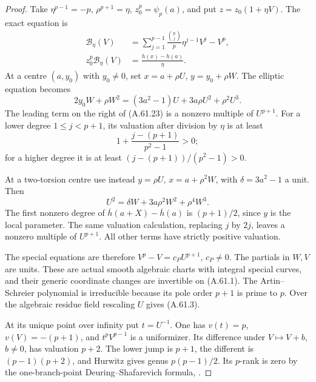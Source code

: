 \begin{proof}
Take \(\eta^{p-1}=-p\), \(\rho^{p+1}=\eta\),
\(z_0^p=\psi_p(a)\), and put
\(z=z_0(1+\eta V)\). The exact equation is
\[
 \begin{aligned}
 \mathcal B_\eta(V)
    &=\sum_{j=1}^{p-1}\frac{\binom pj}{p}
                       \eta^{j-1}V^j-V^p,\\
 z_0^p\mathcal B_\eta(V)
    &=\frac{h(x)-h(a)}{\eta}.
 \end{aligned} \tag{A.61.23}
\]
At a centre \((a,y_0)\) with \(y_0\ne0\), set
\(x=a+\rho U\), \(y=y_0+\rho W\). The elliptic
equation becomes
\[
 2y_0W+\rho W^2
             =(3a^2-1)U+3a\rho U^2+\rho^2U^3.         \tag{A.61.24}
\]
The leading term on the right of (A.61.23) is
a nonzero multiple of \(U^{p+1}\).
For a lower degree \(1\le j<p+1\), its valuation
after division by \(\eta\) is at least
\[
                   1+\frac{j-(p+1)}{p^2-1}>0;
                                                        \tag{A.61.25}
\]
for a higher degree it is at least
\((j-(p+1))/(p^2-1)>0\).

At a two-torsion centre use instead
\(y=\rho U\), \(x=a+\rho^2W\), with
\(\delta=3a^2-1\) a unit. Then
\[
                 U^2=\delta W+3a\rho^2W^2+\rho^4W^3.
                                                        \tag{A.61.26}
\]
The first nonzero degree of
\(\overline h(a+X)-\overline h(a)\) is
\((p+1)/2\), since \(y\) is the local parameter.
The same valuation calculation, replacing \(j\)
by \(2j\), leaves a nonzero multiple of
\(U^{p+1}\). All other terms have strictly
positive valuation.

The special equations are therefore
\(V^p-V=c_PU^{p+1}\), \(c_P\ne0\).
The partials in \(W,V\) are units. These are
actual smooth algebraic charts with integral
special curves, and their generic coordinate
changes are invertible on (A.61.1). The
Artin--Schreier polynomial is irreducible because
its pole order \(p+1\) is prime to \(p\).
Over the algebraic residue field rescaling
\(U\) gives (A.61.3).

At its unique point over infinity put \(t=U^{-1}\).
One has \(v(t)=p\), \(v(V)=-(p+1)\), and
\(t^pV^{p-1}\) is a uniformizer. Its difference
under \(V\mapsto V+b\), \(b\ne0\), has
valuation \(p+2\). The lower jump is \(p+1\),
the different is \((p-1)(p+2)\), and Hurwitz
gives genus \(p(p-1)/2\). Its \(p\)-rank is
zero by the one-branch-point Deuring--Shafarevich
formula, \cite[Corollary 1.8]{fghCrew1984}.


\end{proof}
